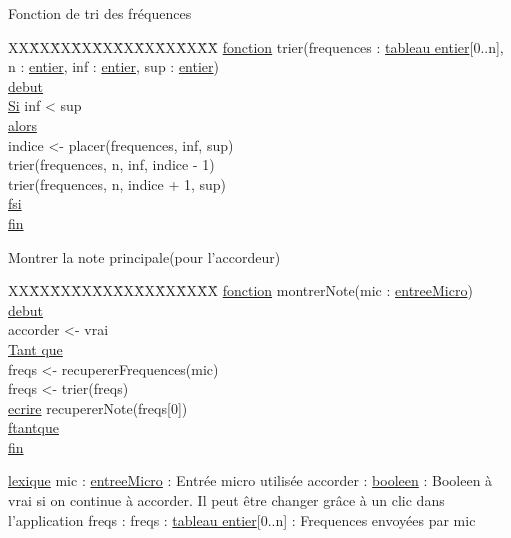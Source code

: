 Fonction de tri des fréquences\newline
\begin{tabbing}
\kill XX\=XX\=XX\=XX\=XX\=XX\=XX\=XX\=XX\=XX\=
\kill
\ul{fonction} trier(frequences : \ul{tableau entier}[0..n], n : \ul{entier}, inf : \ul{entier}, sup : \ul{entier})\\
\ul{debut}\\
    \>\ul{Si} inf < sup\\
    \>\ul{alors}\\
        \>\>indice <- placer(frequences, inf, sup)\\
        \>\>trier(frequences, n, inf, indice - 1)\\
        \>\>trier(frequences, n, indice + 1, sup)\\
    \>\ul{fsi}\\
\ul{fin}\\ 
\end{tabbing}

Montrer la note principale(pour l'accordeur)\newline
\begin{tabbing}
\kill XX\=XX\=XX\=XX\=XX\=XX\=XX\=XX\=XX\=XX\=
\kill
\ul{fonction} montrerNote(mic : \ul{entreeMicro})\\
\ul{debut}\\
\>accorder <- vrai\\
\>\ul{Tant que}\\
    \>\>freqs <- recupererFrequences(mic)\\
    \>\>freqs <- trier(freqs)\\
    \>\>\ul{ecrire} recupererNote(freqs[0])\\
\>\ul{ftantque}\\
\ul{fin}\\
\end{tabbing}

\ul{lexique}\newline
mic : \ul{entreeMicro} : Entrée micro utilisée\newline
accorder : \ul{booleen} : Booleen à vrai si on continue à accorder. Il peut être changer grâce à un clic dans l'application\newline
freqs : freqs : \ul{tableau entier}[0..n] : Frequences envoyées par mic\newline
\newline

